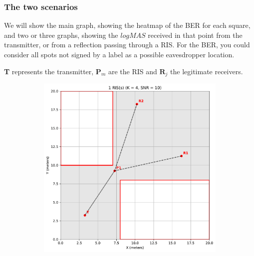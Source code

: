 \begin{itemize}
\end{itemize}

\subsubsection{The two scenarios}

We will show the main graph, showing the heatmap of the BER for each square, and two or three graphs, showing the $logMAS$ received in that point from the transmitter, or from a reflection passing through a RIS. For the BER, you could consider all spots not signed by a label as a possible eavesdropper location.

\textbf{T} represents the transmitter, $\bm{P}_m$ are the RIS and $\bm{R}_j$ the legitimate receivers.

\begin{figure}[H]
  \centering
  \begin{subfigure}[b]{0.48\textwidth}
    \centering
    \includegraphics[width=\textwidth]{imgs/heatmap-simulations/1 RIS(s) (K = 4, SNR = 10).pdf}
  \end{subfigure}
  \hfill
  \begin{subfigure}[b]{0.48\textwidth}
    \centering

\end{subfigure}
\end{figure}
